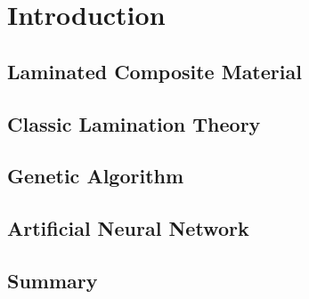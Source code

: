 
\chapter{Introduction} %

\label{Chapter1} %


\section{Laminated Composite Material}

\section{Classic Lamination Theory}

\section{Genetic Algorithm}

\section{Artificial Neural Network}

\section{Summary}


